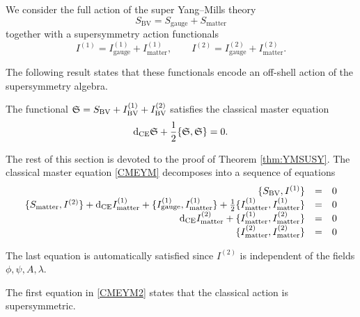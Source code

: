 \documentclass[10pt, oneside]{article}
\newcommand{\BV}{\mathrm{BV}}
\newcommand{\gauge}{\mathrm{gauge}}
\newcommand{\matter}{\mathrm{matter}}
\begin{document}
We consider the full action of the super Yang--Mills theory
\[S_{\BV} = S_{\gauge} + S_{\matter}\]
together with a supersymmetry action functionals
\[I^{(1)} = I^{(1)}_{\gauge} + I^{(1)}_{\matter},\qquad I^{(2)} = I^{(2)}_{\gauge} + I^{(2)}_{\matter}.\]

The following result states that these functionals encode an off-shell action of the supersymmetry algebra.

\begin{theorem}
The functional $\fS = S_{\BV} + I_{\BV}^{(1)} + I_{\BV}^{(2)}$ satisfies the classical master equation
\begin{equation}
\label{CMEYM}
{\rm d}_{\mathrm{CE}} \mathfrak S + \frac{1}{2} \{\mathfrak S, \mathfrak S\} = 0 .
\end{equation}
\label{thm:YMSUSY}
\end{theorem}

The rest of this section is devoted to the proof of Theorem \ref{thm:YMSUSY}. The classical master equation \eqref{CMEYM} decomposes into a sequence of equations
\begin{equation}
\label{CMEYM2}
\begin{array}{rrrrrr}
\{S_{\BV} , I^{(1)}\} & = & 0 \\ 
\{S_{\matter}, I^{(2)}\} + \d_{\mr{CE}} I_{\matter}^{(1)} + \{I_{\gauge}^{(1)}, I_{\matter}^{(1)}\} + \frac{1}{2} \{I_{\matter}^{(1)}, I_{\matter}^{(1)}\} & = & 0 \\
\d_{\mr{CE}} I_{\matter}^{(2)} + \{I_{\matter}^{(1)}, I_{\matter}^{(2)}\} & =& 0 \\
\{I_{\matter}^{(2)}, I_{\matter}^{(2)}\} & =& 0
\end{array}
\end{equation}

The last equation is automatically satisfied since $I^{(2)}$ is independent of the fields $\phi, \psi, A, \lambda$.

The first equation in \eqref{CMEYM2} states that the classical action is supersymmetric.
\end{document}
